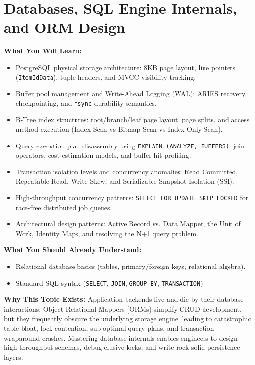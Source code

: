 \chapter{Databases, SQL Engine Internals, and ORM Design}
\label{chap:databases-sql-orm}

\begin{chaptergoalsbox}
\textbf{What You Will Learn:}
\begin{itemize}[leftmargin=12pt,itemsep=2pt]
  \item PostgreSQL physical storage architecture: 8KB page layout, line pointers (\texttt{ItemIdData}), tuple headers, and MVCC visibility tracking.
  \item Buffer pool management and Write-Ahead Logging (WAL): ARIES recovery, checkpointing, and \texttt{fsync} durability semantics.
  \item B-Tree index structures: root/branch/leaf page layout, page splits, and access method execution (Index Scan vs Bitmap Scan vs Index Only Scan).
  \item Query execution plan disassembly using \texttt{EXPLAIN (ANALYZE, BUFFERS)}: join operators, cost estimation models, and buffer hit profiling.
  \item Transaction isolation levels and concurrency anomalies: Read Committed, Repeatable Read, Write Skew, and Serializable Snapshot Isolation (SSI).
  \item High-throughput concurrency patterns: \texttt{SELECT FOR UPDATE SKIP LOCKED} for race-free distributed job queues.
  \item Architectural design patterns: Active Record vs. Data Mapper, the Unit of Work, Identity Maps, and resolving the N+1 query problem.
\end{itemize}

\textbf{What You Should Already Understand:}
\begin{itemize}[leftmargin=12pt,itemsep=2pt]
  \item Relational database basics (tables, primary/foreign keys, relational algebra).
  \item Standard SQL syntax (\texttt{SELECT}, \texttt{JOIN}, \texttt{GROUP BY}, \texttt{TRANSACTION}).
\end{itemize}

\textbf{Why This Topic Exists:}
Application backends live and die by their database interactions. Object-Relational Mappers (ORMs) simplify CRUD development, but they frequently obscure the underlying storage engine, leading to catastrophic table bloat, lock contention, sub-optimal query plans, and transaction wraparound crashes. Mastering database internals enables engineers to design high-throughput schemas, debug elusive locks, and write rock-solid persistence layers.


\end{chaptergoalsbox}
